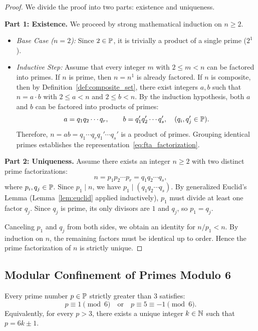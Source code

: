 \begin{proof}
\leanok
We divide the proof into two parts: existence and uniqueness.

\textbf{Part 1: Existence.} We proceed by strong mathematical induction on $n \ge 2$.
\begin{itemize}
  \item \emph{Base Case ($n = 2$):} Since $2 \in \mathbb{P}$, it is trivially a product of a single prime ($2^1$).
  \item \emph{Inductive Step:} Assume that every integer $m$ with $2 \le m < n$ can be factored into primes. If $n$ is prime, then $n = n^1$ is already factored. If $n$ is composite, then by Definition~\ref{def:composite_set}, there exist integers $a, b$ such that $n = a \cdot b$ with $2 \le a < n$ and $2 \le b < n$. By the induction hypothesis, both $a$ and $b$ can be factored into products of primes:
  $$a = q_1 q_2 \cdots q_r, \qquad b = q_1' q_2' \cdots q_s', \quad (q_i, q_j' \in \mathbb{P}).$$
  Therefore, $n = a b = q_1 \cdots q_r q_1' \cdots q_s'$ is a product of primes. Grouping identical primes establishes the representation~\eqref{eq:fta_factorization}.
\end{itemize}

\textbf{Part 2: Uniqueness.} Assume there exists an integer $n \ge 2$ with two distinct prime factorizations:
$$n = p_1 p_2 \cdots p_r = q_1 q_2 \cdots q_s,$$
where $p_i, q_j \in \mathbb{P}$. Since $p_1 \mid n$, we have $p_1 \mid (q_1 q_2 \cdots q_s)$. By generalized Euclid's Lemma (Lemma~\ref{lem:euclid} applied inductively), $p_1$ must divide at least one factor $q_j$. Since $q_j$ is prime, its only divisors are $1$ and $q_j$, so $p_1 = q_j$.

Canceling $p_1$ and $q_j$ from both sides, we obtain an identity for $n / p_1 < n$. By induction on $n$, the remaining factors must be identical up to order. Hence the prime factorization of $n$ is strictly unique.
\end{proof}

\subsection{Modular Confinement of Primes Modulo 6}

\begin{theorem}
\label{thm:mod6_confinement}
\leanok
Every prime number $p \in \mathbb{P}$ strictly greater than $3$ satisfies:
\begin{equation}
\label{eq:mod6}
p \equiv 1 \pmod 6 \quad \text{or} \quad p \equiv 5 \equiv -1 \pmod 6.
\end{equation}
Equivalently, for every $p > 3$, there exists a unique integer $k \in \mathbb{N}$ such that $p = 6k \pm 1$.
\end{theorem}

